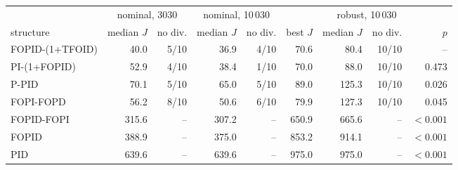 \begin{tabular}{lrrrrrrrr}
\toprule
 & \multicolumn{2}{c}{nominal, 3030} & \multicolumn{2}{c}{nominal, 10\,030} & \multicolumn{4}{c}{robust, 10\,030} \\ \cmidrule(lr){2-3}\cmidrule(lr){4-5}\cmidrule(lr){6-9}
structure & median $J$ & no div. & median $J$ & no div. & best $J$ & median $J$ & no div. & $p$ \\
\midrule
FOPID-(1+TFOID) & 40.0 & 5/10 & 36.9 & 4/10 & 70.6 & 80.4 & 10/10 & -- \\
PI-(1+FOPID) & 52.9 & 4/10 & 38.4 & 1/10 & 70.0 & 88.0 & 10/10 & 0.473 \\
P-PID & 70.1 & 5/10 & 65.0 & 5/10 & 89.0 & 125.3 & 10/10 & 0.026 \\
FOPI-FOPD & 56.2 & 8/10 & 50.6 & 6/10 & 79.9 & 127.3 & 10/10 & 0.045 \\
FOPID-FOPI & 315.6 & -- & 307.2 & -- & 650.9 & 665.6 & -- & $<0.001$ \\
FOPID & 388.9 & -- & 375.0 & -- & 853.2 & 914.1 & -- & $<0.001$ \\
PID & 639.6 & -- & 639.6 & -- & 975.0 & 975.0 & -- & $<0.001$ \\
\bottomrule
\end{tabular}
